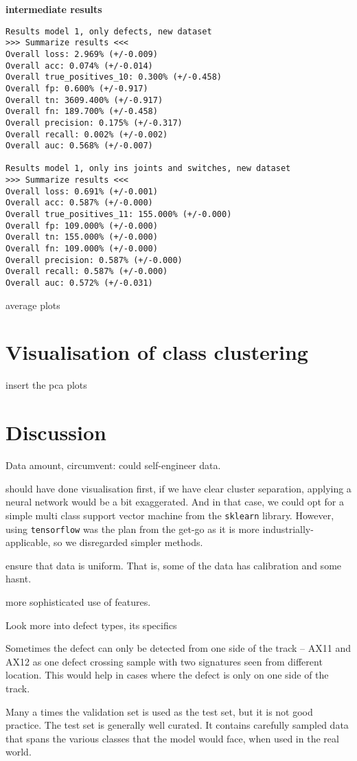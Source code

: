 \textbf{intermediate results}
\begin{verbatim}
Results model 1, only defects, new dataset
>>> Summarize results <<<
Overall loss: 2.969% (+/-0.009)
Overall acc: 0.074% (+/-0.014)
Overall true_positives_10: 0.300% (+/-0.458)
Overall fp: 0.600% (+/-0.917)
Overall tn: 3609.400% (+/-0.917)
Overall fn: 189.700% (+/-0.458)
Overall precision: 0.175% (+/-0.317)
Overall recall: 0.002% (+/-0.002)
Overall auc: 0.568% (+/-0.007)

Results model 1, only ins joints and switches, new dataset
>>> Summarize results <<<
Overall loss: 0.691% (+/-0.001)
Overall acc: 0.587% (+/-0.000)
Overall true_positives_11: 155.000% (+/-0.000)
Overall fp: 109.000% (+/-0.000)
Overall tn: 155.000% (+/-0.000)
Overall fn: 109.000% (+/-0.000)
Overall precision: 0.587% (+/-0.000)
Overall recall: 0.587% (+/-0.000)
Overall auc: 0.572% (+/-0.031)
\end{verbatim}

average plots

\section{Visualisation of class clustering}
insert the pca plots

\section{Discussion}
Data amount, circumvent: could self-engineer data. 

should have done visualisation first, if we have clear cluster separation, applying a neural network would be a bit exaggerated. And in that case, we could opt for a simple multi class support vector machine from the \verb|sklearn| library. However, using \verb|tensorflow| was the plan from the get-go as it is more industrially-applicable, so we disregarded simpler methods.

ensure that data is uniform. That is, some of the data has calibration and some hasnt. 

more sophisticated use of features.

Look more into defect types, its specifics

Sometimes the defect can only be detected from one side of the track -- AX11 and AX12 as one defect crossing sample with two signatures seen from different location. This would help in cases where the defect is only on one side of the track.

Many a times the validation set is used as the test set, but it is not good practice. The test set is generally well curated. It contains carefully sampled data that spans the various classes that the model would face, when used in the real world.


